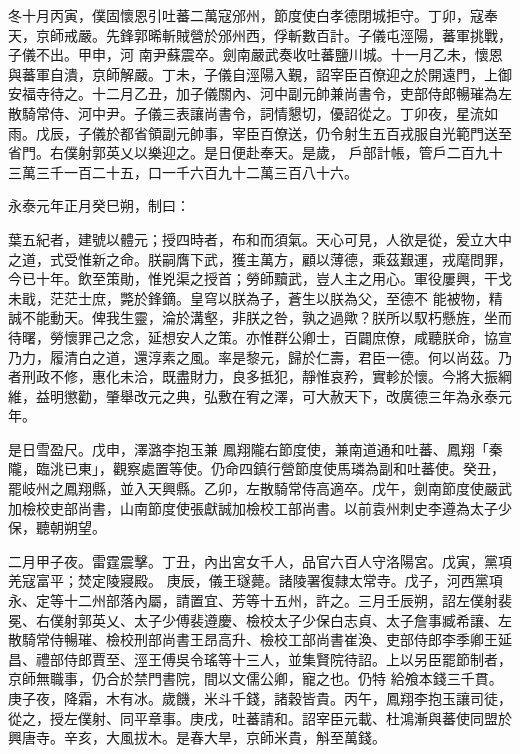 \begin{pinyinscope}
 冬十月丙寅，僕固懷恩引吐蕃二萬寇邠州，節度使白孝德閉城拒守。丁卯，寇奉天，京師戒嚴。先鋒郭晞斬賊營於邠州西，俘斬數百計。子儀屯涇陽，蕃軍挑戰，子儀不出。甲申，河
 南尹蘇震卒。劍南嚴武奏收吐蕃鹽川城。十一月乙未，懷恩與蕃軍自潰，京師解嚴。丁未，子儀自涇陽入覲，詔宰臣百僚迎之於開遠門，上御安福寺待之。十二月乙丑，加子儀關內、河中副元帥兼尚書令，吏部侍郎暢璀為左散騎常侍、河中尹。子儀三表讓尚書令，詞情懇切，優詔從之。丁卯夜，星流如雨。戊辰，子儀於都省領副元帥事，宰臣百僚送，仍令射生五百戎服自光範門送至省門。右僕射郭英乂以樂迎之。是日便赴奉天。是歲，
 戶部計帳，管戶二百九十三萬三千一百二十五，口一千六百九十二萬三百八十六。



 永泰元年正月癸巳朔，制曰：



 葉五紀者，建號以體元；授四時者，布和而須氣。天心可見，人欲是從，爰立大中之道，式受惟新之命。朕嗣膺下武，獲主萬方，顧以薄德，乘茲艱運，戎麾問罪，今已十年。飲至策勛，惟兇渠之授首；勞師黷武，豈人主之用心。軍役屢興，干戈未戢，茫茫士庶，斃於鋒鏑。皇穹以朕為子，蒼生以朕為父，至德不
 能被物，精誠不能動天。俾我生靈，淪於溝壑，非朕之咎，孰之過歟？朕所以馭朽懸旌，坐而待曙，勞懷罪己之念，延想安人之策。亦惟群公卿士，百闢庶僚，咸聽朕命，協宣乃力，履清白之道，還淳素之風。率是黎元，歸於仁壽，君臣一德。何以尚茲。乃者刑政不修，惠化未洽，既盡財力，良多抵犯，靜惟哀矜，實軫於懷。今將大振綱維，益明懲勸，肇舉改元之典，弘敷在宥之澤，可大赦天下，改廣德三年為永泰元年。



 是日雪盈尺。戊申，澤潞李抱玉兼
 鳳翔隴右節度使，兼南道通和吐蕃、鳳翔「秦隴，臨洮已東」，觀察處置等使。仍命四鎮行營節度使馬璘為副和吐蕃使。癸丑，罷岐州之鳳翔縣，並入天興縣。乙卯，左散騎常侍高適卒。戊午，劍南節度使嚴武加檢校吏部尚書，山南節度使張獻誠加檢校工部尚書。以前袁州刺史李遵為太子少保，聽朝朔望。



 二月甲子夜。雷霆震擊。丁丑，內出宮女千人，品官六百人守洛陽宮。戊寅，黨項羌寇富平；焚定陵寢殿。
 庚辰，儀王璲薨。諸陵署復隸太常寺。戊子，河西黨項永、定等十二州部落內屬，請置宜、芳等十五州，許之。三月壬辰朔，詔左僕射裴冕、右僕射郭英乂、太子少傅裴遵慶、檢校太子少保白志貞、太子詹事臧希讓、左散騎常侍暢璀、檢校刑部尚書王昂高升、檢校工部尚書崔渙、吏部侍郎李季卿王延昌、禮部侍郎賈至、涇王傅吳令瑤等十三人，並集賢院待詔。上以另臣罷節制者，京師無職事，仍合於禁門書院，間以文儒公卿，寵之也。仍特
 給飧本錢三千貫。庚子夜，降霜，木有冰。歲饑，米斗千錢，諸穀皆貴。丙午，鳳翔李抱玉讓司徒，從之，授左僕射、同平章事。庚戌，吐蕃請和。詔宰臣元載、杜鴻漸與蕃使同盟於興唐寺。辛亥，大風拔木。是春大旱，京師米貴，斛至萬錢。




\end{pinyinscope}
